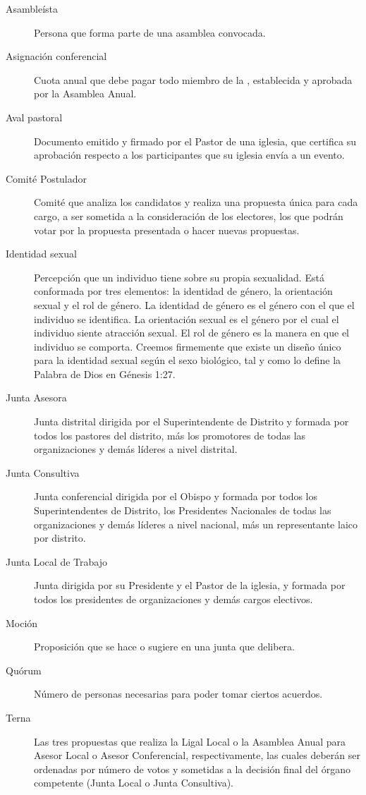 
\begin{description}
    \item[Asambleísta] Persona que forma parte de una asamblea convocada.
    \item[Asignación conferencial] Cuota anual que debe pagar todo miembro de la \LMJ{}, establecida y aprobada por la Asamblea Anual.
    \item[Aval pastoral] Documento emitido y firmado por el Pastor de una iglesia, que certifica su aprobación respecto a los participantes que su iglesia envía a un evento.
    \item[Comité Postulador] Comité que analiza los candidatos y realiza una propuesta única para cada cargo, a ser sometida a la consideración de los electores, los que podrán votar por la propuesta presentada o hacer nuevas propuestas.
    \item[Identidad sexual] Percepción que un individuo tiene sobre su propia sexualidad. Está conformada por tres elementos: la identidad de género, la orientación sexual y el rol de género. La identidad de género es el género con el que el individuo se identifica. La orientación sexual es el género por el cual el individuo siente atracción sexual. El rol de género es la manera en que el individuo se comporta. Creemos firmemente que existe un diseño único para la identidad sexual según el sexo biológico, tal y como lo define la Palabra de Dios en Génesis 1:27.
    \item[Junta Asesora] Junta distrital dirigida por el Superintendente de Distrito y formada por todos los pastores del distrito, más los promotores de todas las organizaciones y demás líderes a nivel distrital.
    \item[Junta Consultiva] Junta conferencial dirigida por el Obispo y formada por todos los Superintendentes de Distrito, los Presidentes Nacionales de todas las organizaciones y demás líderes a nivel nacional, más un representante laico por distrito.
    \item[Junta Local de Trabajo] Junta dirigida por su Presidente y el Pastor de la iglesia, y formada por todos los presidentes de organizaciones y demás cargos electivos.
    \item[Moción] Proposición que se hace o sugiere en una junta que delibera.
    \item[Quórum] Número de personas necesarias para poder tomar ciertos acuerdos.
    \item[Terna] Las tres propuestas que realiza la Ligal Local o la Asamblea Anual para Asesor Local o Asesor Conferencial, respectivamente, las cuales deberán ser ordenadas por número de votos y sometidas a la decisión final del órgano competente (Junta Local o Junta Consultiva).
\end{description}
